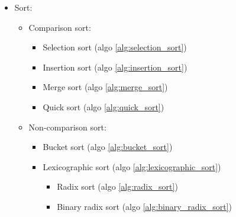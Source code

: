 {{		
	}{ %
		\begin{itemize}[nosep]
			\item Sort:
			\begin{itemize}[nosep]
				\item Comparison sort:
				\begin{itemize}[nosep]
					\item Selection sort (algo \ref{alg:selection_sort})
					\item Insertion sort (algo \ref{alg:insertion_sort})
					\item Merge sort (algo \ref{alg:merge_sort})
					\item Quick sort (algo \ref{alg:quick_sort})
				\end{itemize}
				\item Non-comparison sort:
				\begin{itemize}[nosep]
					\item Bucket sort (algo \ref{alg:bucket_sort})
					\item Lexicographic sort (algo \ref{alg:lexicographic_sort})
					\begin{itemize}[nosep]
						\item Radix sort (algo \ref{alg:radix_sort})
						\item Binary radix sort (algo \ref{alg:binary_radix_sort})
					\end{itemize}
				\end{itemize}
			\end{itemize}
		\end{itemize}
	}{} %
	}
